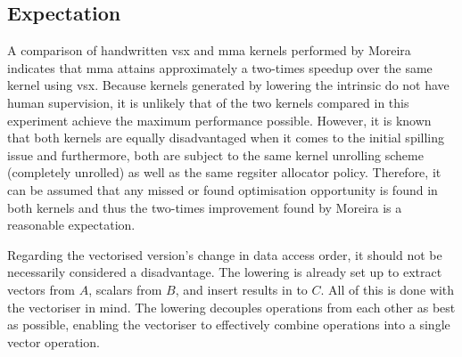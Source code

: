 \documentclass[\main/thesis.tex]{subfiles}
\begin{document}
\subsection{Expectation}
A comparison of handwritten \gls{vsx} and \gls{mma} kernels performed by Moreira \etal~\autocite{moreira2021matrix} indicates that \gls{mma} attains approximately a two-times speedup over the same kernel using \gls{vsx}.
Because kernels generated by lowering the  intrinsic do not have human supervision, it is unlikely that of the two kernels compared in this experiment achieve the maximum performance possible.
However, it is known that both kernels are equally disadvantaged when it comes to the initial spilling issue and furthermore, both are subject to the same kernel unrolling scheme (\ie completely unrolled) as well as the same regsiter allocator policy.
Therefore, it can be assumed that any missed or found optimisation opportunity is found in both kernels and thus the two-times improvement found by Moreira \etal is a reasonable expectation.

Regarding the vectorised version's change in data access order, it should not be necessarily considered a disadvantage.
The lowering is already set up to extract vectors from $A$, scalars from $B$, and insert results in to $C$.
All of this is done with the vectoriser in mind.
The lowering decouples operations from each other as best as possible, enabling the vectoriser to effectively combine operations into a single vector operation.
\end{document}
